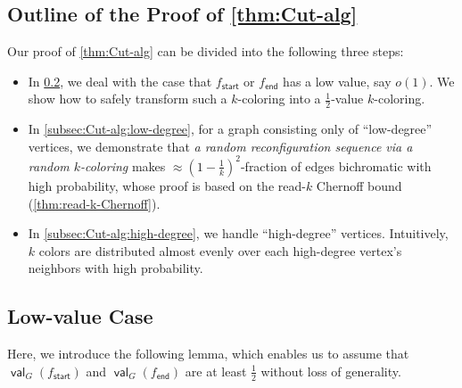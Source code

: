 \documentclass[11pt,fleqn]{article}
\DeclareMathOperator{\val}{\mathsf{val}}
\newcommand{\sss}{\mathsf{start}}
\newcommand{\ttt}{\mathsf{end}}
\newcommand{\f}{f}
\theoremstyle{definition}
\numberwithin{equation}{section}
\begin{document}
\subsection{Outline of the Proof of \texorpdfstring{\cref{thm:Cut-alg}}{Theorem~\protect\ref{thm:Cut-alg}}}
Our proof of \cref{thm:Cut-alg} can be divided into the following three steps:
\begin{itemize}
    \item In \cref{subsec:Cut-alg:low-value},
        we deal with the case that 
        $\f_\sss$ or $\f_\ttt$ has a low value, say $o(1)$.
        We show how to safely transform such a $k$-coloring into a $\frac{1}{2}$-value $k$-coloring.

    \item In \cref{subsec:Cut-alg:low-degree},
        for a graph consisting only of ``low-degree'' vertices,
        we demonstrate that \emph{a random reconfiguration sequence via a random $k$-coloring}
        makes $\approx \left(1-\frac{1}{k}\right)^2$-fraction of edges bichromatic with high probability,
        whose proof is based on the read-$k$ Chernoff bound (\cref{thm:read-k-Chernoff}).

    \item In \cref{subsec:Cut-alg:high-degree},
        we handle ``high-degree'' vertices.
        Intuitively,
        $k$ colors are distributed almost evenly over
        each high-degree vertex's neighbors with high probability.
\end{itemize}


\subsection{Low-value Case}
\label{subsec:Cut-alg:low-value}
Here, we introduce the following lemma, which enables us to assume that
$\val_G(\f_\sss)$ and $\val_G(\f_\ttt)$ are at least $\frac{1}{2}$ without loss of generality.
\end{document}
